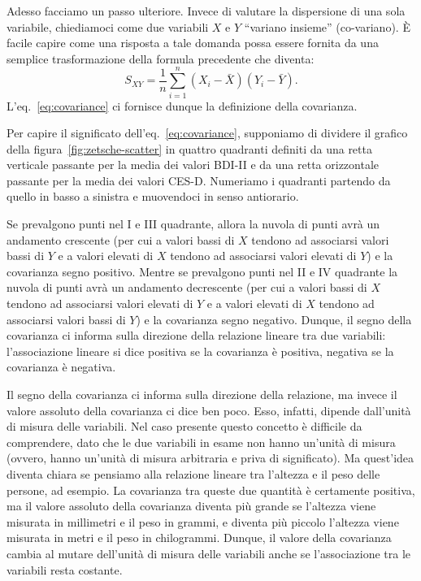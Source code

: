 \documentclass[
  10pt,
  italian,
  a4paper,
  extrafontsizes,onecolumn,openright
  ]{memoir}
\theoremstyle{definition}
\theoremstyle{definition}
\theoremstyle{definition}
\theoremstyle{definition}
\theoremstyle{remark}
\begin{document}
Adesso facciamo un passo ulteriore. Invece di valutare la dispersione di
una sola variabile, chiediamoci come due variabili \(X\) e \(Y\) ``variano
insieme'' (co-variano). È facile capire come una risposta a tale domanda
possa essere fornita da una semplice trasformazione della formula
precedente che diventa:
\begin{equation}
S_{XY} = \frac{1}{n} \sum_{i=1}^n(X_i - \bar{X}) (Y_i - \bar{Y}).
\label{eq:covariance}
\end{equation}
L'eq.~\eqref{eq:covariance} ci fornisce dunque la definizione della covarianza.

Per capire il significato dell'eq.~\eqref{eq:covariance}, supponiamo di dividere il grafico della figura~\ref{fig:zetsche-scatter} in quattro quadranti definiti da una retta verticale passante per la media dei valori BDI-II e da una retta orizzontale passante per la media dei valori CES-D. Numeriamo i quadranti partendo da quello in basso a sinistra e muovendoci in senso antiorario.

Se prevalgono punti nel I e III quadrante, allora la nuvola di punti
avrà un andamento crescente (per cui a valori bassi di \(X\) tendono ad
associarsi valori bassi di \(Y\) e a valori elevati di \(X\) tendono ad
associarsi valori elevati di \(Y\)) e la covarianza segno positivo. Mentre
se prevalgono punti nel II e IV quadrante la nuvola di punti avrà un
andamento decrescente (per cui a valori bassi di \(X\) tendono ad
associarsi valori elevati di \(Y\) e a valori elevati di \(X\) tendono ad
associarsi valori bassi di \(Y\)) e la covarianza segno negativo. Dunque,
il segno della covarianza ci informa sulla direzione della relazione
lineare tra due variabili: l'associazione lineare si dice positiva se la
covarianza è positiva, negativa se la covarianza è negativa.

Il segno della covarianza ci informa sulla direzione della relazione, ma
invece il valore assoluto della covarianza ci dice ben poco. Esso,
infatti, dipende dall'unità di misura delle variabili. Nel caso presente
questo concetto è difficile da comprendere, dato che le due variabili in
esame non hanno un'unità di misura (ovvero, hanno un'unità di misura
arbitraria e priva di significato). Ma quest'idea diventa chiara se
pensiamo alla relazione lineare tra l'altezza e il peso delle persone,
ad esempio. La covarianza tra queste due quantità è certamente positiva,
ma il valore assoluto della covarianza diventa più grande se l'altezza
viene misurata in millimetri e il peso in grammi, e diventa più piccolo
l'altezza viene misurata in metri e il peso in chilogrammi. Dunque, il
valore della covarianza cambia al mutare dell'unità di misura delle
variabili anche se l'associazione tra le variabili resta costante.
\end{document}
